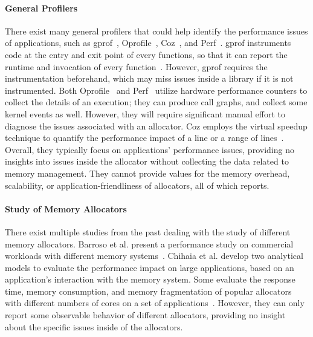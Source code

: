 \paragraph{General Profilers} There exist many general profilers that could help identify the performance issues of applications, such as  gprof~\cite{DBLP:conf/sigplan/GrahamKM82}, Oprofile~\cite{levon2004oprofile}, Coz~\cite{Coz}, and Perf~\cite{perf}. gprof instruments code at the entry and exit point of every functions, so that it can report the runtime and invocation of every function~\cite{DBLP:conf/sigplan/GrahamKM82}. However, gprof requires the instrumentation beforehand, which may miss issues inside a library if it is not instrumented. Both Oprofile~\cite{levon2004oprofile} and Perf~\cite{perf} utilize hardware performance counters to collect the details of an execution; they can produce call graphs, and collect some kernel events as well. However, they will require significant manual effort to diagnose the issues associated with an allocator. Coz employs the virtual speedup technique to quantify the performance impact of a line or a range of lines~\cite{Coz}. Overall, they typically focus on applications' performance issues, providing no insights into issues inside the allocator without collecting the data related to memory management. They cannot provide values for the memory overhead, scalability, or application-friendliness of allocators, all of which \MP{} reports.


\paragraph{Study of Memory Allocators} There exist multiple studies from the past dealing with the study of different memory allocators. Barroso et al. present a performance study on commercial workloads with different memory systems~\cite{Barroso:1998:MSC:279358.279363}. Chihaia et al. develop two analytical models to evaluate the performance impact on large applications, based on an application's interaction with the memory system\cite{1291361}. Some evaluate the response time, memory consumption, and memory fragmentation of popular allocators with different numbers of cores on a set of applications~\cite{6084042, ferreira2011comparison}. 
However, they can only report some observable behavior of different allocators, providing no insight about the specific issues inside of the allocators. 







